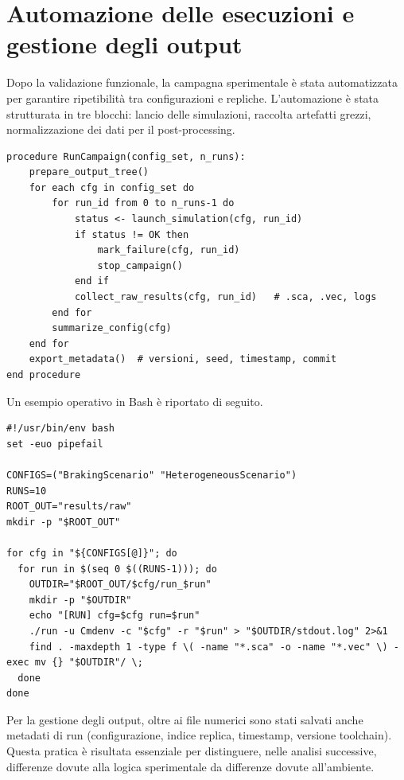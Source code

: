 \section{Automazione delle esecuzioni e gestione degli output}

Dopo la validazione funzionale, la campagna sperimentale è stata automatizzata per garantire ripetibilità tra configurazioni e repliche. L’automazione è stata strutturata in tre blocchi: lancio delle simulazioni, raccolta artefatti grezzi, normalizzazione dei dati per il post-processing.

\begin{lstlisting}[caption={Pseudocodice della pipeline di esecuzione},label={lst:pseudocode_pipeline}]
procedure RunCampaign(config_set, n_runs):
    prepare_output_tree()
    for each cfg in config_set do
        for run_id from 0 to n_runs-1 do
            status <- launch_simulation(cfg, run_id)
            if status != OK then
                mark_failure(cfg, run_id)
                stop_campaign()
            end if
            collect_raw_results(cfg, run_id)   # .sca, .vec, logs
        end for
        summarize_config(cfg)
    end for
    export_metadata()  # versioni, seed, timestamp, commit
end procedure
\end{lstlisting}

Un esempio operativo in Bash è riportato di seguito.

\begin{lstlisting}[caption={Template Bash per batch run e raccolta risultati},label={lst:bash_campaign}]
#!/usr/bin/env bash
set -euo pipefail

CONFIGS=("BrakingScenario" "HeterogeneousScenario")
RUNS=10
ROOT_OUT="results/raw"
mkdir -p "$ROOT_OUT"

for cfg in "${CONFIGS[@]}"; do
  for run in $(seq 0 $((RUNS-1))); do
    OUTDIR="$ROOT_OUT/$cfg/run_$run"
    mkdir -p "$OUTDIR"
    echo "[RUN] cfg=$cfg run=$run"
    ./run -u Cmdenv -c "$cfg" -r "$run" > "$OUTDIR/stdout.log" 2>&1
    find . -maxdepth 1 -type f \( -name "*.sca" -o -name "*.vec" \) -exec mv {} "$OUTDIR"/ \;
  done
done
\end{lstlisting}

Per la gestione degli output, oltre ai file numerici sono stati salvati anche metadati di run (configurazione, indice replica, timestamp, versione toolchain). Questa pratica è risultata essenziale per distinguere, nelle analisi successive, differenze dovute alla logica sperimentale da differenze dovute all’ambiente.
